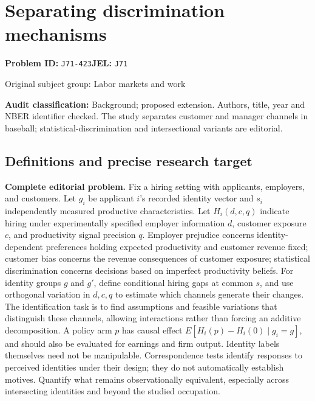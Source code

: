 \documentclass[11pt,a4paper]{article}
\begin{document}
\section*{Separating discrimination mechanisms}
\textbf{Problem ID:} \texttt{J71-423}\quad \textbf{JEL:} \texttt{J71}\par
\label{problem:OP-0356}
{\sffamily\small\color{muted}Original subject group: Labor markets and work\par}
\label{definitions:problem:30007638}
\textbf{Audit classification:} Background; proposed extension. Authors, title, year and NBER identifier checked. The study separates customer and manager channels in baseball; statistical-discrimination and intersectional variants are editorial.
\subsection*{Definitions and precise research target}
\textbf{Complete editorial problem.} Fix a hiring setting with applicants, employers, and customers. Let \(g_i\) be applicant \(i\)'s recorded identity vector and \(s_i\) independently measured productive characteristics. Let \(H_i(d,c,q)\) indicate hiring under experimentally specified employer information \(d\), customer exposure \(c\), and productivity signal precision \(q\). Employer prejudice concerns identity-dependent preferences holding expected productivity and customer revenue fixed; customer bias concerns the revenue consequences of customer exposure; statistical discrimination concerns decisions based on imperfect productivity beliefs. For identity groups \(g\) and \(g'\), define conditional hiring gaps at common \(s\), and use orthogonal variation in \(d,c,q\) to estimate which channels generate their changes. The identification task is to find assumptions and feasible variations that distinguish these channels, allowing interactions rather than forcing an additive decomposition. A policy arm \(p\) has causal effect \(E[H_i(p)-H_i(0)\mid g_i=g]\), and should also be evaluated for earnings and firm output. Identity labels themselves need not be manipulable. Correspondence tests identify responses to perceived identities under their design; they do not automatically establish motives. Quantify what remains observationally equivalent, especially across intersecting identities and beyond the studied occupation.
\end{document}
